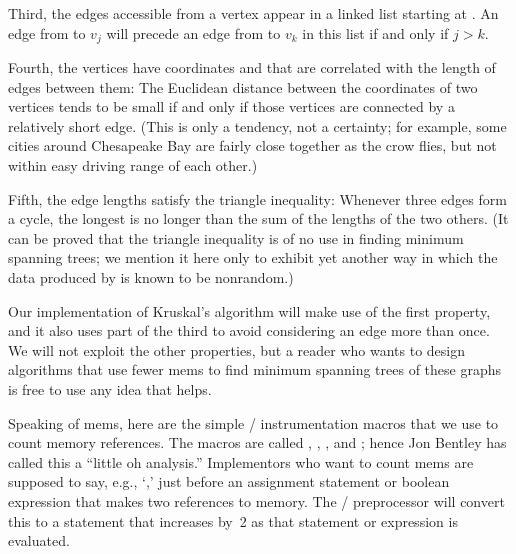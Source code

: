 Third, the edges accessible from a vertex  appear in a linked list
starting at . An edge from  to $v_j$ will precede
an
edge from  to $v_k$ in this list if and only if $j>k$.

Fourth, the vertices have coordinates  and 
that are correlated with the length of edges between them: The
Euclidean distance between the coordinates of two vertices tends to be small
if and only if those vertices are connected by a relatively short edge.
(This is only a tendency, not a certainty; for example, some cities
around Chesapeake Bay are fairly close together as the crow flies, but not
within easy driving range of each other.)

Fifth, the edge lengths satisfy the triangle inequality: Whenever
three edges form a cycle, the longest is no longer than the sum of
the lengths of the two others. (It can be proved that
the triangle inequality is of no use in finding minimum spanning
trees; we mention it here only to exhibit yet another way in which
the data produced by  is known to be nonrandom.)

Our implementation of Kruskal's algorithm will make use of the first
property, and it also uses part of the third to avoid considering an
edge more than once. We will not exploit the other properties, but a
reader who wants to design algorithms that use fewer mems to find minimum
spanning trees of these graphs is free to use any idea that helps.

\fi

Speaking of mems, here are the simple \CEE/ instrumentation macros that
we
use to count memory references. The macros are called , , %
,
and ; hence Jon Bentley has called this a ``little oh analysis.''
Implementors who want to count mems are supposed to say, e.g., `,'
just before an assignment statement or boolean expression that makes
two references to memory. The \CEE/ preprocessor will convert this
to a statement that increases  by~2 as that statement or
expression
is evaluated.

